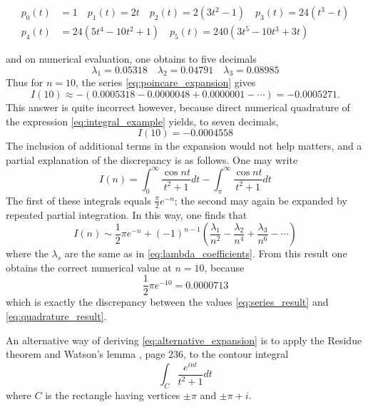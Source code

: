 \documentclass{article}
\begin{document}
\begin{align}
  p_0 (t) & = 1 \quad p_1 (t) = 2 t \quad p_2 (t) = 2 (3 t^2 - 1) \quad p_3
  (t) = 24 (t^3 - t)  \label{eq:explicit_polynomials}\\
  p_4 (t) & = 24 (5 t^4 - 10 t^2 + 1) \quad p_5 (t) = 240 (3 t^5 - 10 t^3 + 3
  t) 
\end{align}

and on numerical evaluation, one obtains to five decimals
\begin{equation}
  \label{eq:numerical_values} \lambda_1 = 0.05318 \quad \lambda_2 = 0.04791
  \quad \lambda_3 = 0.08985
\end{equation}
Thus for $n = 10$, the series \eqref{eq:poincare_expansion} gives
\begin{equation}
  \label{eq:series_result} I (10) \approx - (0.0005318 - 0.0000048 + 0.0000001
  - \cdots) = - 0.0005271.
\end{equation}
This answer is quite incorrect however, because direct numerical quadrature of
the expression \eqref{eq:integral_example} yields, to seven decimals,
\begin{equation}
  \label{eq:quadrature_result} I (10) = - 0.0004558
\end{equation}
The inclusion of additional terms in the expansion would not help matters, and
a partial explanation of the discrepancy is as follows. One may write
\begin{equation}
  \label{eq:integral_split} I (n) = \int_0^{\infty} \frac{\cos nt}{t^2 + 1} dt
  - \int_{\pi}^{\infty} \frac{\cos nt}{t^2 + 1} dt
\end{equation}
The first of these integrals equals $\frac{\pi}{2} e^{- n}$; the second may
again be expanded by repeated partial integration. In this way, one finds that
\begin{equation}
  \label{eq:alternative_expansion} I (n) \sim \frac{1}{2} \pi e^{- n} + (-
  1)^{n - 1}  \left( \frac{\lambda_1}{n^2} - \frac{\lambda_2}{n^4} +
  \frac{\lambda_3}{n^6} - \cdots \right)
\end{equation}
where the $\lambda_s$ are the same as in \eqref{eq:lambda_coefficients}. From
this result one obtains the correct numerical value at $n = 10$, because
\begin{equation}
  \label{eq:correct_value} \frac{1}{2} \pi e^{- 10} = 0.0000713
\end{equation}
which is exactly the discrepancy between the values \eqref{eq:series_result}
and \eqref{eq:quadrature_result}.

An alternative way of deriving \eqref{eq:alternative_expansion} is to apply
the Residue theorem and Watson's lemma {\cite{watson_lemma}}, page 236, to the
contour integral
\begin{equation}
  \label{eq:contour_integral} \int_C \frac{e^{int}}{t^2 + 1} dt
\end{equation}
where $C$ is the rectangle having vertices $\pm \pi$ and $\pm \pi + i$.
\end{document}
